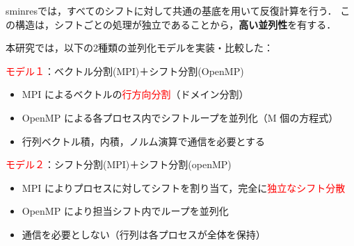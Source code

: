 

sminresでは，すべてのシフトに対して共通の基底を用いて反復計算を行う．  
この構造は，シフトごとの処理が独立であることから，\textbf{高い並列性}を有する．

本研究では，以下の2種類の並列化モデルを実装・比較した：

\textcolor{red}{モデル１}：ベクトル分割(MPI)＋シフト分割(OpenMP)
\begin{itemize} \setlength{\itemsep}{0pt}
	\item MPI によるベクトルの\textcolor{red}{行方向分割}（ドメイン分割）
	\item OpenMP による各プロセス内でシフトループを並列化（M 個の方程式）
	\item 行列ベクトル積，内積，ノルム演算で通信を必要とする
\end{itemize}
\vspace{0.5em}
\textcolor{red}{モデル２}：シフト分割(MPI)＋シフト分割(openMP)
\begin{itemize} \setlength{\itemsep}{0pt}
	\item MPI によりプロセスに対してシフトを割り当て，完全に\textcolor{red}{独立なシフト分散}
	\item OpenMP により担当シフト内でループを並列化
	\item 通信を必要としない（行列は各プロセスが全体を保持）
\end{itemize}

